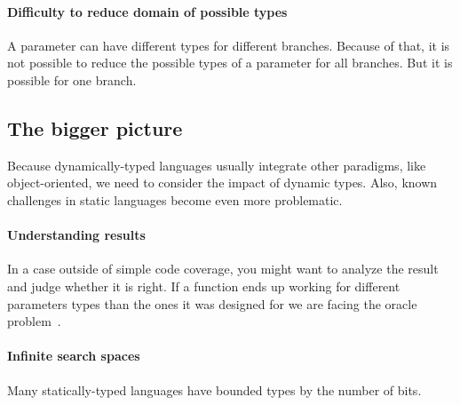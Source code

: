 \documentclass{llncs2e/llncs}
\begin{document}

\paragraph{Difficulty to reduce domain of possible types} A parameter can have
different types for different branches. Because of that, it is not possible to
reduce the possible types of a parameter for all branches. But it is possible
for one branch.

\subsection{The bigger picture}
Because dynamically-typed languages usually integrate other paradigms, like
object-oriented, we need to consider the impact of dynamic types. Also, known
challenges in static languages become even more problematic.

\paragraph{Understanding results} In a case outside of simple code coverage, you
might want to analyze the result and judge whether it is right. If a function
ends up working for different parameters types than the ones it was designed for
we are facing the oracle problem~\cite{barr2015oracle}.

\paragraph{Infinite search spaces} Many statically-typed languages have bounded
types by the number of bits.
\end{document}
